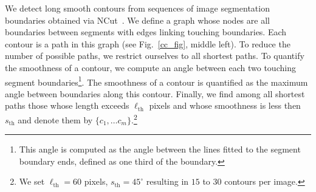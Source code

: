  We detect long smooth contours from sequences of image segmentation boundaries obtained via NCut~\cite{cour05}.
We define a graph whose nodes are all boundaries between segments with edges linking touching boundaries. Each contour is a path in this graph (see Fig.~\ref{cc_fig}, middle left). To reduce the number of possible paths, we restrict ourselves to all shortest paths. To quantify the smoothness of a contour, we compute an angle between each two touching segment boundaries\footnote{This angle is computed as the angle between the lines fitted to the segment boundary ends, defined as one third of the boundary. }. The smoothness of a contour is quantified as the maximum angle between boundaries along this contour. Finally, we find among all shortest paths those whose length exceeds $\ell_{\textrm{th}}$ pixels and whose smoothness is less then $s_{\textrm{th}}$ and denote them by $\{c_1,\dots c_m\}$.\footnote{We set $\ell_{\textrm{th}} = 60$ pixels, $s_{\textrm{th}} = 45^\circ$ resulting in $15$ to $30$ contours per image.}



